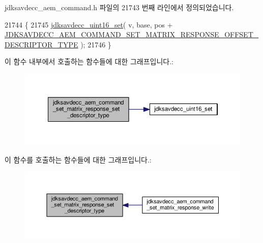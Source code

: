 jdksavdecc\+\_\+aem\+\_\+command.\+h 파일의 21743 번째 라인에서 정의되었습니다.


\begin{DoxyCode}
21744 \{
21745     \hyperlink{group__endian_ga14b9eeadc05f94334096c127c955a60b}{jdksavdecc\_uint16\_set}( v, base, pos + 
      \hyperlink{group__command__set__matrix__response_gab7d18dbe7b67add857dffdf7ecf21846}{JDKSAVDECC\_AEM\_COMMAND\_SET\_MATRIX\_RESPONSE\_OFFSET\_DESCRIPTOR\_TYPE}
       );
21746 \}
\end{DoxyCode}


이 함수 내부에서 호출하는 함수들에 대한 그래프입니다.\+:
\nopagebreak
\begin{figure}[H]
\begin{center}
\leavevmode
\includegraphics[width=350pt]{group__command__set__matrix__response_gafe02acad4e7919ab5beba6468cbe12d9_cgraph}
\end{center}
\end{figure}




이 함수를 호출하는 함수들에 대한 그래프입니다.\+:
\nopagebreak
\begin{figure}[H]
\begin{center}
\leavevmode
\includegraphics[width=350pt]{group__command__set__matrix__response_gafe02acad4e7919ab5beba6468cbe12d9_icgraph}
\end{center}
\end{figure}


